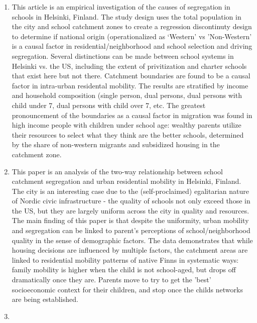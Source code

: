 \documentclass{article}
\begin{document}
\begin{enumerate}
\item \cite{kauppinen2022UnderstandingEffects}

This article is an empirical investigation of the causes of
segregation in schools in Helsinki, Finland. The study design uses the
total population in the city and school catchment zones to create a
regression discontinuty design to determine if national origin
(operationalized as `Western' vs 'Non-Western' is a causal factor in
residential/neighborhood and school selection and driving
segregation. Several distinctions can be made between school systems
in Helsinki vs. the US, including the extent of privitization and
charter schools that exist here but not there. Catchment boundaries
are found to be a causal factor in intra-urban residental
mobility. The results are stratified by income and household
composition (single person, dual persons, dual persons with child
under 7, dual persons with child over 7, etc. The greatest
pronouncement of the boundaries as a causal factor in migration was
found in high income people with children under school age: wealthy
parents utilize their resources to select what they think are the
better schools, determined by the share of non-western migrants and
subsidized housing in the catchment zone.

\item \cite{bernelius2019PupilsMove}

This paper is an analysis of the two-way relationship between school
catchment segregation and urban residential mobility in Helsinki,
Finland. The city is an interesting case due to the (self-proclaimed)
egalitarian nature of Nordic civic infrastructure - the quality of
schools not only exceed those in the US, but they are largely uniform
across the city in quality and resources. The main finding of this
paper is that despite the uniformity, urban mobility and segregation
can be linked to parent's perceptions of school/neighborhood quality
in the sense of demographic factors. The data demonstrates that while
housing decisions are influenced by multiple factors, the catchment
areas are linked to residential mobility patterns of native Finns in
systematic ways: family mobility is higher when the child is not
school-aged, but drops off dramatically once they are. Parents move to
try to get the 'best' socioeconomic context for their children, and
stop once the childs networks are being established.

\item \cite{burrell2021SocietyAlgorithms}


\end{enumerate}
\end{document}
